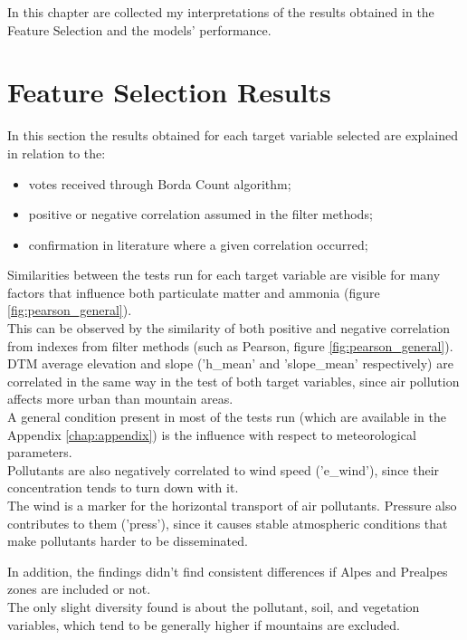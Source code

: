In this chapter are collected my interpretations of the results obtained in the Feature Selection and the models' performance.
\\
\section{Feature Selection Results}
In this section the results obtained for each target variable selected are explained in relation to the:
\begin{itemize}
    \item votes received through Borda Count algorithm;
    \item positive or negative correlation assumed in the filter methods;
    \item confirmation in literature where a given correlation occurred; 
\end{itemize}
Similarities between the tests run for each target variable are visible for many factors that influence both particulate matter and ammonia (figure \ref{fig:pearson_general}).\\
This can be observed by the similarity of both positive and negative correlation from indexes from filter methods (such as Pearson, figure \ref{fig:pearson_general}). \\
DTM average elevation and slope ('h\_mean' and 'slope\_mean' respectively) are correlated in the same way in the test of both target variables, since air pollution affects more urban than mountain areas.\\
A general condition present in most of the tests run (which are available in the Appendix \ref{chap:appendix}) is the influence with respect to meteorological parameters.\\
Pollutants are also negatively correlated to wind speed ('e\_wind'), since their concentration tends to turn down with it.\\ The wind is a marker for the horizontal transport of air pollutants. Pressure also contributes to them ('press'), since it causes stable atmospheric conditions that make pollutants harder to be disseminated. \par
In addition, the findings didn't find consistent differences if Alpes and Prealpes zones are included or not.\\
The only slight diversity found is about the pollutant, soil, and vegetation variables, which tend to be generally higher if mountains are excluded.

